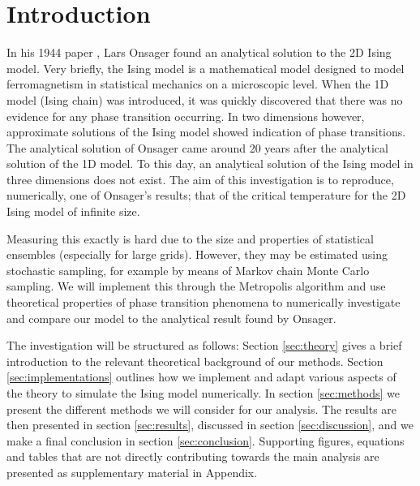 \section{Introduction}\label{sec:introduction}
In his 1944 paper \cite{Onsager_Ising2D}, Lars Onsager found an analytical solution to the 2D Ising model. Very briefly, the Ising model is a mathematical model designed to model ferromagnetism in statistical mechanics on a microscopic level. When the 1D model (Ising chain) was introduced, it was quickly discovered that there was no evidence for any phase transition occurring. In two dimensions however, approximate solutions of the Ising model showed indication of phase transitions. The analytical solution of Onsager came around 20 years after the analytical solution of the 1D model. To this day, an analytical solution of the Ising model in three dimensions does not exist. The aim of this investigation is to reproduce, numerically, one of Onsager's results; that of the critical temperature for the 2D Ising model of infinite size. 

Measuring this exactly is hard due to the size and properties of statistical ensembles (especially for large grids). However, they may be estimated using stochastic sampling, for example by means of Markov chain Monte Carlo sampling. We will implement this through the Metropolis algorithm and use theoretical properties of phase transition phenomena to numerically investigate and compare our model to the analytical result found by Onsager. 

The investigation will be structured as follows: Section \ref{sec:theory} gives a brief introduction to the relevant theoretical background of our methods. Section \ref{sec:implementations} outlines how we implement and adapt various aspects of the theory to simulate the Ising model numerically. In section  \ref{sec:methods} we present the different methods we will consider for our analysis. The results are then presented in section \ref{sec:results}, discussed in section \ref{sec:discussion}, and we make a final conclusion in section \ref{sec:conclusion}. Supporting figures, equations and tables that are not directly contributing towards the main analysis are presented as supplementary material in Appendix.

